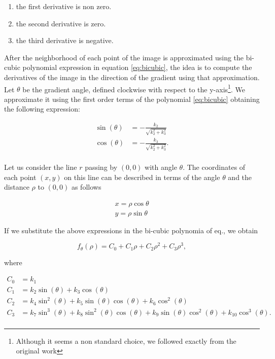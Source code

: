 \documentclass{ipol}
\numberwithin{equation}{section}
\numberwithin{table}{section}
\begin{document}
\begin{enumerate}
\item the first derivative is non zero.
\item the second derivative is zero.
\item the third derivative is negative.
\end{enumerate}

After the neighborhood of each point of the image is approximated using the bi-cubic polynomial expression in equation \ref{eq:bicubic}, the idea is to compute the derivatives of the image in the direction of the gradient using that approximation.\\

Let $\theta$ be the gradient angle, defined clockwise with respect to the y-axis\footnote{Although it seems a non standard choice, we followed exactly from the original work}. We approximate it using the first order terms of the polynomial \ref{eq:bicubic} obtaining the following expression:

\begin{align}
\label{eq:sincos}
	\sin(\theta) & = -\frac{k_2}{\sqrt{k_2^2 + k_3^2}} \nonumber \\
	\cos(\theta) & = -\frac{k_3}{\sqrt{k_2^2 + k_3^2}}. \\
\end{align}

Let us consider the line $r$ passing by $(0,0)$ with angle $\theta$. The coordinates of each point $(x,y)$ on this line can be described in terms of  the angle $\theta$ and the distance $\rho$ to $(0,0)$ as follows

\begin{align*}
	x = \rho\cos{\theta} \\
	y = \rho\sin{\theta} 
\end{align*}

If we substitute the above expressions in the bi-cubic polynomia of eq., we obtain

\begin{equation}
	f_{\theta}(\rho) = C_0 + C_1\rho + C_2\rho^2 + C_3\rho^3 ,
\end{equation}

where

\begin{align}
\label{eq:c}
	C_0 & = k_1 \nonumber \nonumber \\
	C_1 & = k_2\sin(\theta) + k_3\cos(\theta) \nonumber \\
	C_2 & = k_4\sin^2(\theta) + k_5\sin(\theta)\cos(\theta) + k_6\cos^2(\theta) \nonumber \\
	C_3 & = k_7\sin^3(\theta) + k_8\sin^2(\theta)\cos(\theta) + k_9\sin(\theta)\cos^2(\theta) + k_{10}\cos^3(\theta). \nonumber \\
\end{align}
\end{document}
